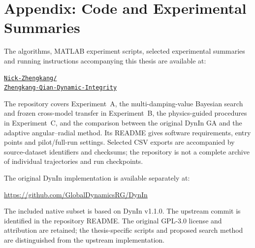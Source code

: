 \chapter*{Appendix: Code and Experimental Summaries}

\begin{greenrevision}
The algorithms, MATLAB experiment scripts, selected experimental summaries
and running instructions accompanying this thesis are available at:

\begin{center}
\href{https://github.com/Nick-Zhengkang/Zhengkang-Qian-Dynamic-Integrity}
{\texttt{Nick-Zhengkang/}}\\
\href{https://github.com/Nick-Zhengkang/Zhengkang-Qian-Dynamic-Integrity}
{\texttt{Zhengkang-Qian-Dynamic-Integrity}}
\end{center}

The repository covers Experiment~A, the multi-damping-value Bayesian search
and frozen cross-model transfer in Experiment~B, the physics-guided procedures
in Experiment~C, and the comparison between the original DynIn GA and the
adaptive angular--radial method. Its README gives software requirements,
entry points and pilot/full-run settings. Selected CSV exports are accompanied
by source-dataset identifiers and checksums; the repository is not a complete
archive of individual trajectories and run checkpoints.

The original DynIn implementation is available separately at:

\begin{center}
\url{https://github.com/GlobalDynamicsRG/DynIn}
\end{center}

The included native subset is based on DynIn v1.1.0. The upstream commit is
identified in the repository README. The original GPL-3.0 license and
attribution are retained; the thesis-specific scripts and proposed search
method are distinguished from the upstream implementation.
\end{greenrevision}
